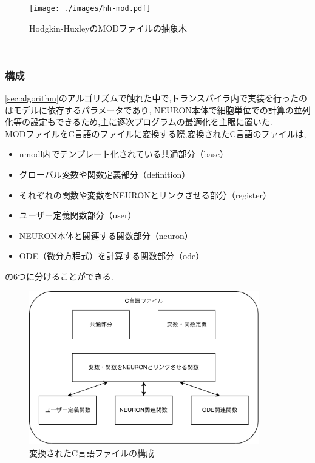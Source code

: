 \begin{figure}[htb]
  \begin{center}
    \texttt{[image: ./images/hh-mod.pdf]}
    \caption{Hodgkin-HuxleyのMODファイルの抽象木}
    \label{fig:hh-mod-ast}
  \end{center}
\end{figure}~\\
\clearpage

\subsubsection{構成}
\ref{sec:algorithm}のアルゴリズムで触れた中で,トランスパイラ内で実装を行ったのはモデルに依存するパラメータであり,
NEURON本体で細胞単位での計算の並列化等の設定もできるため,主に逐次プログラムの最適化を主眼に置いた.\\

MODファイルをC言語のファイルに変換する際,変換されたC言語のファイルは,\\
\begin{itemize}
\item nmodl内でテンプレート化されている共通部分（base）
\item グローバル変数や関数定義部分（definition）
\item それぞれの関数や変数をNEURONとリンクさせる部分（register）
\item ユーザー定義関数部分（user）
\item NEURON本体と関連する関数部分（neuron）
\item ODE（微分方程式）を計算する関数部分（ode）
\end{itemize}
の6つに分けることができる.\\

\begin{figure}[htb]
  \begin{center}
    \includegraphics[width=10.0cm]{./images/transpiler-c-file.pdf}
    \caption{変換されたC言語ファイルの構成}
    \label{fig:transpiler}
  \end{center}
\end{figure}~\\

